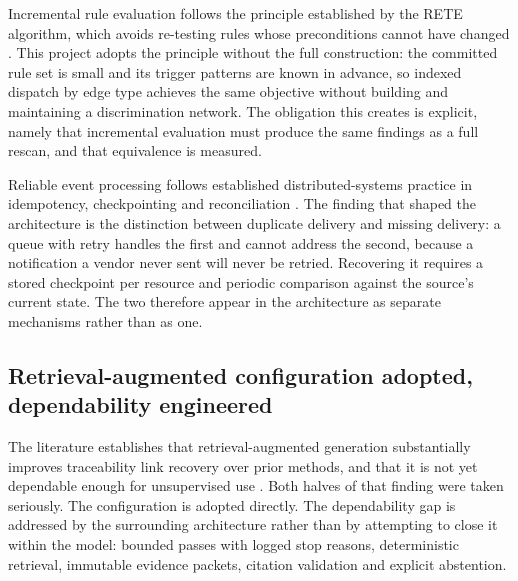 Incremental rule evaluation follows the principle established by the RETE
algorithm, which avoids re-testing rules whose preconditions cannot have changed
\cite{forgy1982}. This project adopts the principle without the full
construction: the committed rule set is small and its trigger patterns are known
in advance, so indexed dispatch by edge type achieves the same objective without
building and maintaining a discrimination network. The obligation this creates
is explicit, namely that incremental evaluation must produce the same findings
as a full rescan, and that equivalence is measured.

Reliable event processing follows established distributed-systems practice in
idempotency, checkpointing and reconciliation \cite{desai2026}. The finding that
shaped the architecture is the distinction between duplicate delivery and
missing delivery: a queue with retry handles the first and cannot address the
second, because a notification a vendor never sent will never be retried.
Recovering it requires a stored checkpoint per resource and periodic comparison
against the source's current state. The two therefore appear in the architecture
as separate mechanisms rather than as one.

\subsection{Retrieval-augmented configuration adopted, dependability engineered}

The literature establishes that retrieval-augmented generation substantially
improves traceability link recovery over prior methods, and that it is not yet
dependable enough for unsupervised use \cite{lissa2025}. Both halves of that
finding were taken seriously. The configuration is adopted directly. The
dependability gap is addressed by the surrounding architecture rather than by
attempting to close it within the model: bounded passes with logged stop
reasons, deterministic retrieval, immutable evidence packets, citation
validation and explicit abstention.

